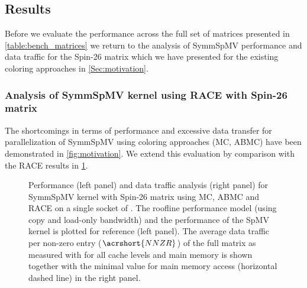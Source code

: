 \subsection{Results}
Before we evaluate the performance across the full set of matrices presented in \cref{table:bench_matrices} we return to the analysis of \acrshort{SymmSpMV} performance and data traffic for the Spin-26 matrix  which we have presented for the existing coloring approaches in \cref{Sec:motivation}. 
%
\subsubsection{Analysis of \acrshort{SymmSpMV} kernel using RACE with Spin-26 matrix}
%
The shortcomings in terms of performance and excessive data transfer for parallelization of \acrshort{SymmSpMV} using coloring approaches (MC, ABMC) have been demonstrated in \cref{fig:motivation}. We extend this evaluation by comparison with the \acrshort{RACE} results in \cref{fig:motivation_w_RACE}.
 \begin{figure}[thbp]
 	\centering
 	\hspace{1em}
 	\caption{Performance (left panel) and data traffic analysis (right panel) for \acrshort{SymmSpMV} kernel with Spin-26 matrix using \acrshort{MC}, \acrshort{ABMC} and \acrshort{RACE} on a single socket of \IVB. The roofline performance model (using copy and load-only bandwidth) and the performance of the \acrshort{SpMV} kernel is plotted for reference (left panel). The average data traffic per non-zero entry ($\acrshort{NNZR}$) of the full matrix as measured with \LIKWID for all cache levels and main memory is shown together with the minimal value for main memory access (horizontal dashed line) in the right panel.}
 	\label{fig:motivation_w_RACE}
 \end{figure}
